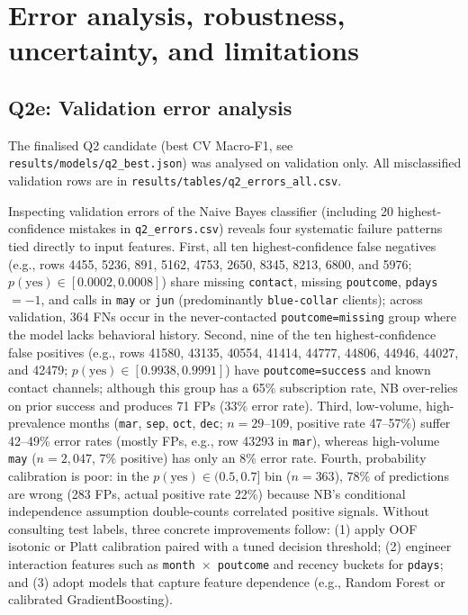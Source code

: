 \section{Error analysis, robustness, uncertainty, and limitations}
\label{sec:errors}

\subsection{Q2e: Validation error analysis}
The finalised Q2 candidate (best CV Macro-F1, see \texttt{results/models/q2\_best.json}) was analysed on
validation only. All misclassified validation rows are in \texttt{results/tables/q2\_errors\_all.csv}.

Inspecting validation errors of the Naive Bayes classifier (including 20 highest-confidence mistakes in \texttt{q2\_errors.csv}) reveals four systematic failure patterns tied directly to input features. First, all ten highest-confidence false negatives (e.g., rows 4455, 5236, 891, 5162, 4753, 2650, 8345, 8213, 6800, and 5976; $p(\text{yes}) \in [0.0002, 0.0008]$) share missing \texttt{contact}, missing \texttt{poutcome}, \texttt{pdays} $= -1$, and calls in \texttt{may} or \texttt{jun} (predominantly \texttt{blue-collar} clients); across validation, 364 FNs occur in the never-contacted \texttt{poutcome=missing} group where the model lacks behavioral history. Second, nine of the ten highest-confidence false positives (e.g., rows 41580, 43135, 40554, 41414, 44777, 44806, 44946, 44027, and 42479; $p(\text{yes}) \in [0.9938, 0.9991]$) have \texttt{poutcome=success} and known contact channels; although this group has a 65\% subscription rate, NB over-relies on prior success and produces 71 FPs (33\% error rate). Third, low-volume, high-prevalence months (\texttt{mar}, \texttt{sep}, \texttt{oct}, \texttt{dec}; $n = 29$--$109$, positive rate 47--57\%) suffer 42--49\% error rates (mostly FPs, e.g., row 43293 in \texttt{mar}), whereas high-volume \texttt{may} ($n = 2{,}047$, 7\% positive) has only an 8\% error rate. Fourth, probability calibration is poor: in the $p(\text{yes}) \in (0.5, 0.7]$ bin ($n = 363$), 78\% of predictions are wrong (283 FPs, actual positive rate 22\%) because NB's conditional independence assumption double-counts correlated positive signals. Without consulting test labels, three concrete improvements follow: (1) apply OOF isotonic or Platt calibration paired with a tuned decision threshold; (2) engineer interaction features such as \texttt{month $\times$ poutcome} and recency buckets for \texttt{pdays}; and (3) adopt models that capture feature dependence (e.g., Random Forest or calibrated GradientBoosting).

